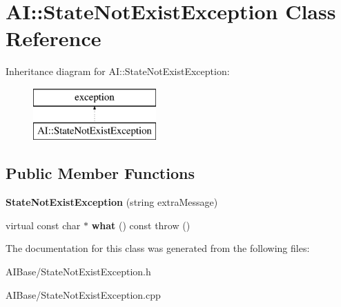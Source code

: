\hypertarget{classAI_1_1StateNotExistException}{\section{A\-I\-:\-:State\-Not\-Exist\-Exception Class Reference}
\label{classAI_1_1StateNotExistException}
}
Inheritance diagram for A\-I\-:\-:State\-Not\-Exist\-Exception\-:\begin{figure}[H]
\begin{center}
\leavevmode
\includegraphics[height=2.000000cm]{classAI_1_1StateNotExistException}
\end{center}
\end{figure}
\subsection*{Public Member Functions}
\begin{DoxyCompactItemize}
\item 
\hypertarget{classAI_1_1StateNotExistException_afba608702bcd8aeb728c3a6a1ff109c1}{{\bfseries State\-Not\-Exist\-Exception} (string extra\-Message)}\label{classAI_1_1StateNotExistException_afba608702bcd8aeb728c3a6a1ff109c1}

\item 
\hypertarget{classAI_1_1StateNotExistException_a97f180bdeef94eb9939bb80caa008951}{virtual const char $\ast$ {\bfseries what} () const   throw ()}\label{classAI_1_1StateNotExistException_a97f180bdeef94eb9939bb80caa008951}

\end{DoxyCompactItemize}


The documentation for this class was generated from the following files\-:\begin{DoxyCompactItemize}
\item 
A\-I\-Base/State\-Not\-Exist\-Exception.\-h\item 
A\-I\-Base/State\-Not\-Exist\-Exception.\-cpp\end{DoxyCompactItemize}
